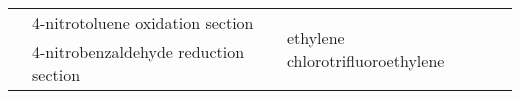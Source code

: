 {\begin{tabular}{@{}lp{5cm}p{2cm}p{2cm}p{12cm}@{}}
                                                      & 4-nitrotoluene oxidation section                       &                                                                                        & \multirow[t]{3}{=}{ethylene chloro\-tri\-fluoro\-ethylene} &                                                                                                                                                                                                                                                                                                                                                                                                                                                                                                                                                                                                                                                                                                                                                                                                                                                                                                                    \\ \cmidrule(l){2-2}
                                                      & 4-nitrobenzaldehyde reduction section                  &                                                                                        &                                                   &                                                                                                                                                                                                                                                                                                                                                                                                                                                                                                                                                                                                                                                                                                                                                                                                                                                                                                                    \\ \cmidrule(l){2-2}

\end{tabular}}

